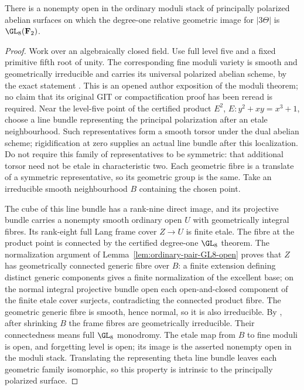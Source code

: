 \begin{lemma}
\label{lem:ordinary-ppav-GL8-open}
There is a nonempty open in the ordinary moduli stack of principally
polarized abelian surfaces on which the degree-one relative geometric
image for $|3\Theta|$ is $\GL_8(\mathbf F_2)$.
\end{lemma}
\begin{proof}
Work over an algebraically closed field. Use full level five and a fixed
primitive fifth root of unity. The corresponding fine moduli variety is
smooth and geometrically irreducible and carries its universal polarized
abelian scheme, by the exact statement
\cite[Theorem~7.3.11, printed p.~76]{ConradAbelianVarietiesModuli}.
This is an opened author exposition of the moduli theorem; no claim that
its original GIT or compactification proof has been reread is required.
Near the level-five point of the certified product
$E^2$, $E:y^2+xy=x^3+1$, choose a line bundle representing the principal
polarization after an etale neighbourhood. Such representatives form a
smooth torsor under the dual abelian scheme; rigidification at zero
supplies an actual line bundle after this localization. Do not require
this family of representatives to be symmetric: that additional torsor
need not be etale in characteristic two. Each geometric fibre is a
translate of a symmetric representative, so its geometric group is the
same. Take an irreducible smooth neighbourhood $B$ containing the chosen
point.

The cube of this line bundle has a rank-nine direct image, and its
projective bundle carries a nonempty smooth ordinary open $U$ with
geometrically integral fibres. Its rank-eight full Lang frame cover
$Z\to U$ is finite etale. The fibre at the product point is connected by
the certified degree-one $\GL_8$ theorem.
The normalization argument of Lemma~\ref{lem:ordinary-pair-GL8-open}
proves that $Z$ has geometrically connected generic fibre over $B$:
a finite extension defining distinct generic components gives a finite
normalization of the excellent base; on the normal integral projective
bundle open each open-and-closed component of the finite etale cover
surjects, contradicting the connected product fibre. The geometric
generic fibre is smooth, hence normal, so it is also irreducible.
By \cite[Lemma~37.27.5]{Stacks0559}, after shrinking $B$ the frame fibres
are geometrically irreducible. Their connectedness means full $\GL_8$
monodromy. The etale map from $B$ to fine moduli is open, and forgetting
level is open; its image is the asserted nonempty open in the moduli
stack. Translating the representing theta line bundle leaves each
geometric family isomorphic, so this property is intrinsic to the
principally polarized surface.
\end{proof}

